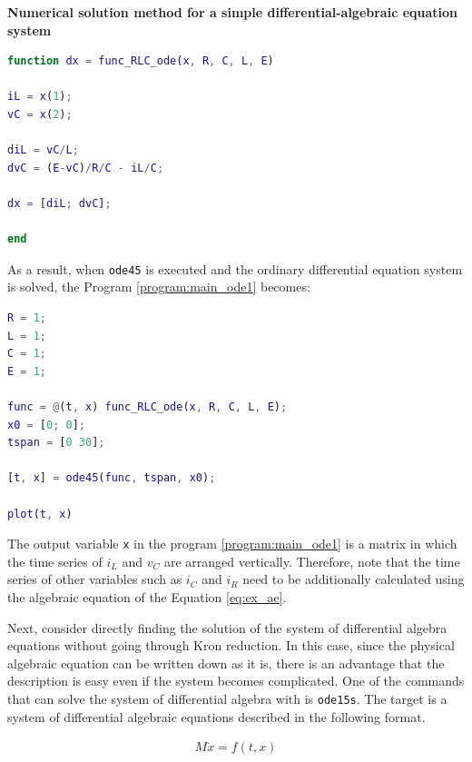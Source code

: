\documentclass[graybox, envcountchap]{svmult}
\begin{document}
\begin{example}{\textbf{Numerical solution method for a simple differential-algebraic
equation system}}
\begin{lstlisting}[language=Matlab, caption=func\_RLC\_ode.m, label={program:ex1_ode}]
function dx = func_RLC_ode(x, R, C, L, E)

iL = x(1);
vC = x(2);

diL = vC/L;
dvC = (E-vC)/R/C - iL/C;

dx = [diL; dvC];

end
\end{lstlisting}

As a result, when \verb|ode45| is executed and the ordinary differential
equation system is solved, the Program \nobreak\ref{program:main_ode1} becomes:


\begin{lstlisting}[language=Matlab, caption=main\_RLC\_ode.m, label={program:main_ode1}]
R = 1;
L = 1;
C = 1;
E = 1;

func = @(t, x) func_RLC_ode(x, R, C, L, E);
x0 = [0; 0];
tspan = [0 30];

[t, x] = ode45(func, tspan, x0);

plot(t, x)
\end{lstlisting}

The output variable \verb|x| in the program \nobreak\ref{program:main_ode1} is
a matrix in which the time series of $i_L$ and $v_C$ are arranged vertically.
Therefore, note that the time series of other variables such as $i_C$ and $i_R$
need to be additionally calculated using the algebraic equation of the Equation
\ref{eq:ex_ae}.

Next, consider directly finding the solution of the system of differential
algebra equations without going through Kron reduction. In this case, since the
physical algebraic equation can be written down as it is, there is an advantage
that the description is easy even if the system becomes complicated. One of the
commands that can solve the system of differential algebra with \matlab is
\verb|ode15s|. The target is a system of differential algebraic equations
described in the following format.

\begin{align}\label{eq:numDAE}
  M\dot{x} = f(t, x)
\end{align}


\end{example}
\end{document}
